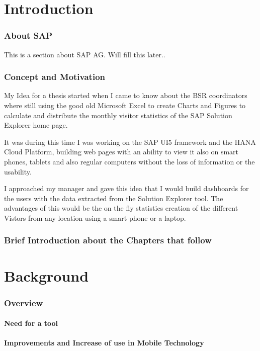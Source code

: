 \documentclass[a4paper, 12pt,oneside]{article}
\begin{document}
%
%
%
%

\setcounter{page}{1}
\hypersetup{pageanchor=true}

\part{Introduction}
\section{About SAP}
This is a section about SAP AG. Will fill this later..
\section{Concept and Motivation}
My Idea for a thesis started when I came to know about the BSR coordinators where still using the good old Microsoft Excel to create Charts and Figures to calculate and distribute the monthly visitor statistics of the SAP Solution Explorer home page.

It was during this time I was working on the SAP UI5 framework and the HANA Cloud Platform, building web pages with an ability to view it also on smart phones, tablets and also regular computers without the loss of information or the usability.

I approached my manager and gave this idea that I would build dashboards for the users with the data extracted from the Solution Explorer tool. The advantages of this would be the on the fly statistics creation of the different Vistors from any location using a smart phone or a laptop.
\section{Brief Introduction about the Chapters that follow}

\pagebreak
\part{Background}
\section{Overview}
\subsection{Need for a tool}
\subsection{Improvements and Increase of use in Mobile Technology}
\end{document}
